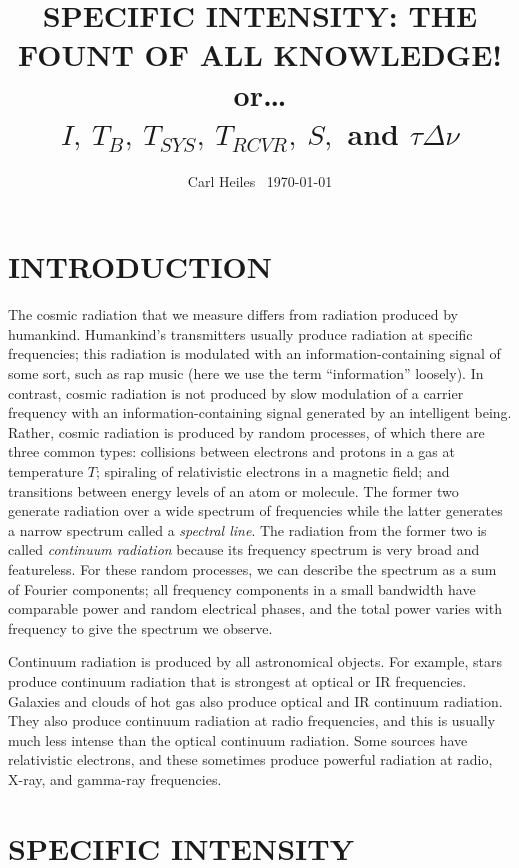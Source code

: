 \documentclass[psfig,preprint]{aastex}
\begin{document}
 
\title{SPECIFIC INTENSITY: THE FOUNT OF ALL KNOWLEDGE! \\ or\dots \\
{\boldmath $I, \ T_B, \ T_{SYS}, \ T_{RCVR}, \ S,$ and $\tau
\Delta \nu$}}


\author{ Carl Heiles \ \today} 

\section {INTRODUCTION}

	The cosmic radiation that we measure differs from radiation
produced by humankind.   Humankind's transmitters usually produce
radiation at specific frequencies; this radiation is modulated with an
information-containing signal of some sort, such as rap music (here we
use the term ``information'' loosely).  In contrast, cosmic radiation is
not produced by slow modulation of a carrier frequency with an
information-containing signal generated by an intelligent being. 
Rather, cosmic radiation is produced by random processes, of which there
are three common types: collisions between electrons and protons in a
gas at temperature $T$; spiraling of relativistic electrons in a
magnetic field; and transitions between energy levels of an atom or
molecule.  The former two generate radiation over a wide spectrum of
frequencies while the latter generates a narrow spectrum called a {\it
spectral line}.  The radiation from the former two is called {\it
continuum radiation} because its frequency spectrum is very broad and
featureless.  For these random processes, we can describe the spectrum
as a sum of Fourier components; all frequency components in a small
bandwidth have comparable power and random electrical phases, and the
total power varies with frequency to give the spectrum we observe.

	Continuum radiation is produced by all astronomical objects. 
For example, stars produce continuum radiation that is strongest at
optical or IR frequencies.  Galaxies and clouds of hot gas also produce
optical and IR continuum radiation.  They also produce continuum
radiation at radio frequencies, and this is usually much less intense
than the optical continuum radiation. Some sources have relativistic
electrons, and these sometimes produce powerful radiation at radio,
X-ray, and gamma-ray frequencies.

\section{SPECIFIC INTENSITY}
\end{document}
